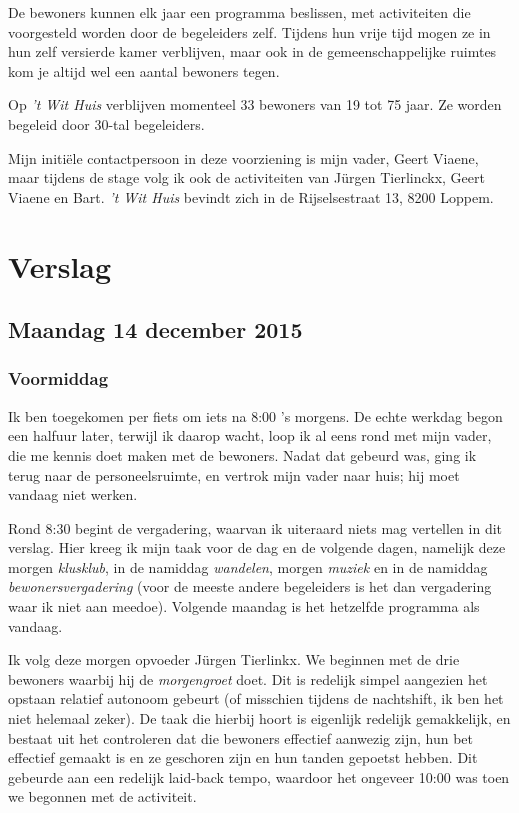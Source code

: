 \documentclass[a4paper,12pt]{article}
\begin{document}
De bewoners kunnen elk jaar een programma beslissen, met activiteiten die voorgesteld worden door de begeleiders zelf. Tijdens hun vrije tijd mogen ze in hun zelf versierde kamer verblijven, maar ook in de gemeenschappelijke ruimtes kom je altijd wel een aantal bewoners tegen.

Op \emph{'t Wit Huis} verblijven momenteel 33 bewoners van 19 tot 75 jaar. Ze worden begeleid door 30-tal begeleiders.

Mijn initiële contactpersoon in deze voorziening is mijn vader, Geert Viaene, maar tijdens de stage volg ik ook de activiteiten van Jürgen Tierlinckx, Geert Viaene en Bart. \emph{'t Wit Huis} bevindt zich in de Rijselsestraat 13, 8200 Loppem.

\section{Verslag}


\subsection{Maandag 14 december 2015}

\subsubsection{Voormiddag}

Ik ben toegekomen per fiets om iets na 8:00 's morgens. De echte werkdag begon een halfuur later, terwijl ik daarop wacht, loop ik al eens rond met mijn vader, die me kennis doet maken met de bewoners. Nadat dat gebeurd was, ging ik terug naar de personeelsruimte, en vertrok mijn vader naar huis; hij moet vandaag niet werken.

Rond 8:30 begint de vergadering, waarvan ik uiteraard niets mag vertellen in dit verslag. Hier kreeg ik mijn taak voor de dag en de volgende dagen, namelijk deze morgen \emph{klusklub}, in de namiddag \emph{wandelen}, morgen \emph{muziek} en in de namiddag \emph{bewonersvergadering} (voor de meeste andere begeleiders is het dan vergadering waar ik niet aan meedoe). Volgende maandag is het hetzelfde programma als vandaag.

Ik volg deze morgen opvoeder Jürgen Tierlinkx. We beginnen met de drie bewoners waarbij hij de \emph{morgengroet} doet. Dit is redelijk simpel aangezien het opstaan relatief autonoom gebeurt (of misschien tijdens de nachtshift, ik ben het niet helemaal zeker). De taak die hierbij hoort is eigenlijk redelijk gemakkelijk, en bestaat uit het controleren dat die bewoners effectief aanwezig zijn, hun bet effectief gemaakt is en ze geschoren zijn en hun tanden gepoetst hebben. Dit gebeurde aan een redelijk laid-back tempo, waardoor het ongeveer 10:00 was toen we begonnen met de activiteit.
\end{document}
